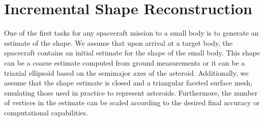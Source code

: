 \documentclass[journal]{new-aiaa}
\begin{document}
\section{Incremental Shape Reconstruction}\label{sec:radius_update}

One of the first tasks for any spacecraft mission to a small body is to generate an estimate of the shape.
We assume that upon arrival at a target body, the spacecraft contains an initial estimate for the shape of the small body.
This shape can be a coarse estimate computed from ground measurements or it can be a triaxial ellipsoid based on the semimajor axes of the asteroid.
Additionally, we assume that the shape estimate is closed and a triangular faceted surface mesh, emulating those used in practice to represent asteroids.
Furthermore, the number of vertices in the estimate can be scaled according to the desired final accuracy or computational capabilities.
\end{document}
